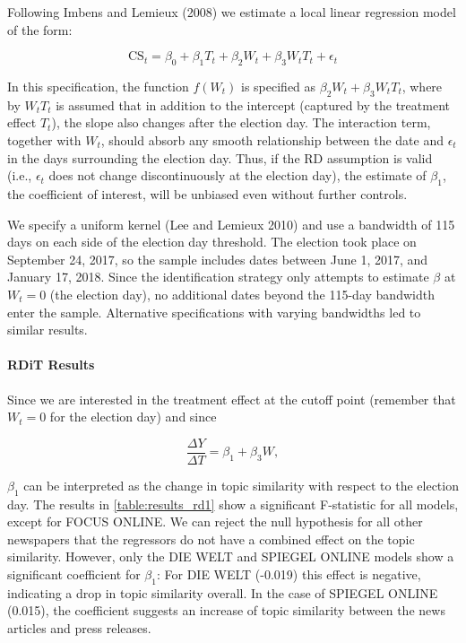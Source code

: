 \documentclass[
  12pt,
]{article}
\begin{document}
Following Imbens and Lemieux (2008) we estimate a local linear
regression model of the form:

\[
\text{CS}_{t}=\beta_0+\beta_1T_t+\beta_2W_t+\beta_3W_tT_t+\epsilon_t
\]

In this specification, the function \(f(W_t)\) is specified as
\(\beta_2W_t+\beta_3W_tT_t\), where by \(W_tT_t\) is assumed that in
addition to the intercept (captured by the treatment effect \(T_t\)),
the slope also changes after the election day. The interaction term,
together with \(W_t\), should absorb any smooth relationship between the
date and \(\epsilon_t\) in the days surrounding the election day. Thus,
if the RD assumption is valid (i.e., \(\epsilon_t\) does not change
discontinuously at the election day), the estimate of \(\beta_1\), the
coefficient of interest, will be unbiased even without further controls.

We specify a uniform kernel (Lee and Lemieux 2010) and use a bandwidth
of 115 days on each side of the election day threshold. The election
took place on September 24, 2017, so the sample includes dates between
June 1, 2017, and January 17, 2018. Since the identification strategy
only attempts to estimate \(\beta\) at \(W_t=0\) (the election day), no
additional dates beyond the 115-day bandwidth enter the sample.
Alternative specifications with varying bandwidths led to similar
results.

\hypertarget{rdit-results}{%
\paragraph{RDiT Results}\label{rdit-results}}

Since we are interested in the treatment effect at the cutoff point
(remember that \(W_t=0\) for the election day) and since

\[
\frac{\Delta Y}{\Delta T}=\beta_1+\beta_3W,
\]

\(\beta_1\) can be interpreted as the change in topic similarity with
respect to the election day. The results in \autoref{table:results_rd1}
show a significant F-statistic for all models, except for FOCUS ONLINE.
We can reject the null hypothesis for all other newspapers that the
regressors do not have a combined effect on the topic similarity.
However, only the DIE WELT and SPIEGEL ONLINE models show a significant
coefficient for \(\beta_1\): For DIE WELT (-0.019) this effect is
negative, indicating a drop in topic similarity overall. In the case of
SPIEGEL ONLINE (0.015), the coefficient suggests an increase of topic
similarity between the news articles and press releases.
\end{document}
